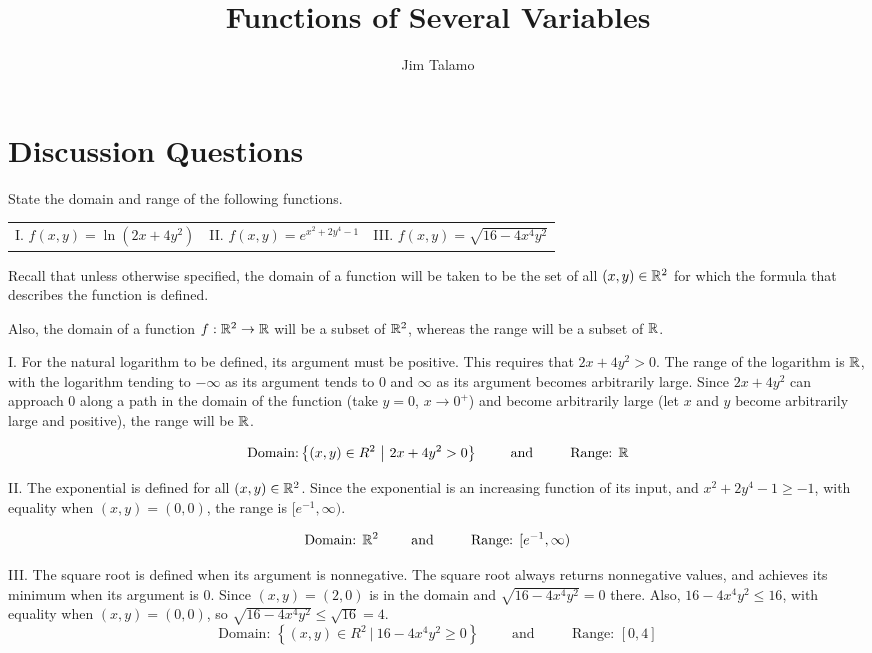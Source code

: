 \documentclass[noauthor]{ximera}
\author{Jim Talamo}
\title[Collaborate:]{Functions of Several Variables}
\newcommand{\Set}[1]{ \left\{ (x,y) \in R^2 ~ \big| ~ #1 \right\} }
\begin{document}
\begin{abstract}
\end{abstract}
\maketitle

\section{Discussion Questions}

\begin{problem}
State the domain and range of the following functions.  
\begin{center}
\begin{tabular}{lll}
I. $f(x,y) = \ln(2x+4y^2)$  &II. $f(x,y) =e^{x^2+2y^4-1}$  &III. $f(x,y) = \sqrt{16- 4x^4y^2} $ \hspace{10mm} 
\end{tabular}
\end{center}

\begin{freeResponse}

Recall that unless otherwise specified, the domain of a function will be taken to be the set of all $(x,y) \in \mathbb R^2$ for which the formula that describes the function is defined.

Also, the domain of a function $f:\mathbb R^2 \to \mathbb R$ will be a subset of $\mathbb R^2$, whereas the range will be a subset of $\mathbb R$.

I. For the natural logarithm to be defined, its argument must be positive. This requires that $2x+4y^2 >0$.  The range of the logarithm is $\mathbb R$, with the logarithm tending to $-\infty$ as its argument tends to $0$ and $\infty$ as its argument becomes arbitrarily large.  Since $2x+4y^2$ can approach $0$ along a path in the domain of the function (take $y=0$, $x \to 0^+$) and become arbitrarily large (let $x$ and $y$ become arbitrarily large and positive), the range will be $\mathbb R$.

\[
\textrm{Domain:} \Set{2x+4y^2 >0} \qquad \textrm{ and } \qquad \textrm{ Range: } \R
\]
 
II. The exponential is defined for all $(x,y) \in \mathbb R^2$.   Since the exponential is an increasing function of its input, and $x^2+2y^4-1 \geq -1$, with equality when $(x,y) = (0,0)$, the range is $[e^{-1},\infty)$.

\[
\textrm{Domain: } \mathbb R^2 \qquad \textrm{ and } \qquad \textrm{ Range: } [e^{-1},\infty)
\]

III. The square root is defined when its argument is nonnegative.   The square root always returns nonnegative values, and achieves its minimum when its argument is $0$.  Since $(x,y) = (2,0)$ is in the domain and $\sqrt{16- 4x^4y^2}=0$ there.  Also, $16-4x^4y^2 \leq 16$, with equality when $(x,y)=(0,0)$, so $\sqrt{16- 4x^4y^2} \leq \sqrt{16} =4$.
\[
\textrm{Domain: } \Set{16-4x^4y^2 \geq 0} \qquad \textrm{ and } \qquad \textrm{ Range: } [0,4]
\]

\end{freeResponse}
\end{problem}
\end{document}
